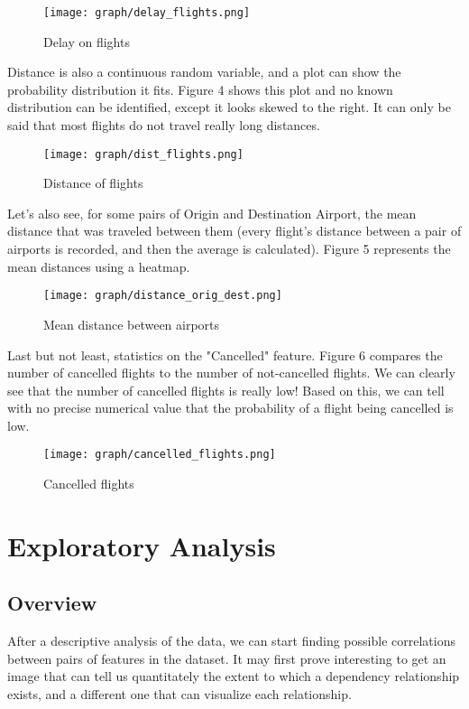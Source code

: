 \documentclass{article}
\begin{document}
	\begin{figure}[H]
      \texttt{[image: graph/delay\_flights.png]}
      \caption{Delay on flights}
      \label{fig:graph1}
    \end{figure}\newline

	Distance is also a continuous random variable, and a plot can show the probability distribution it fits. Figure 4 shows this plot
	and no known distribution can be identified, except it looks skewed to the right. It can only be said that most flights do not
	travel really long distances.

	\begin{figure}[H]
      \texttt{[image: graph/dist\_flights.png]}
      \caption{Distance of flights}
      \label{fig:graph1}
    \end{figure}\newline

	Let's also see, for some pairs of Origin and Destination Airport, the mean distance that was traveled between them (every flight's distance between a pair of airports is recorded, and then the average is calculated). Figure 5 represents the mean distances using a heatmap.

	\begin{figure}[H]
	  \texttt{[image: graph/distance\_orig\_dest.png]}
	  \caption{Mean distance between airports}
	  \label{fig:graph1}
	\end{figure}\newline

	Last but not least, statistics on the "Cancelled" feature. Figure 6 compares the number of cancelled flights to the number of not-cancelled flights. We can clearly see that the number of cancelled flights is really low! Based on this, we can tell with no
	precise numerical value that the probability of a flight being cancelled is low.

	\begin{figure}[H]
      \texttt{[image: graph/cancelled\_flights.png]}
      \caption{Cancelled flights}
      \label{fig:graph1}
    \end{figure}\newline

	\newpage
    \section{Exploratory Analysis}
	\subsection{Overview}
		After a descriptive analysis of the data, we can start finding possible correlations between pairs of features in the dataset. It may first prove interesting to get an image that can tell us quantitately the extent to which a dependency relationship exists, and a different one that can visualize each relationship.
\end{document}

